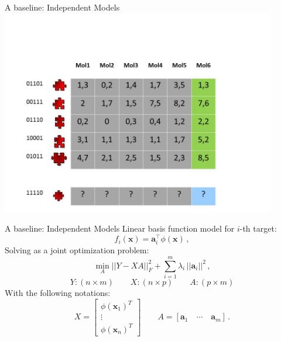 \documentclass[]{beamer}
\renewcommand{\vec}[1]{\boldsymbol{#1}}
\begin{document}
\begin{frame}{A baseline: Independent Models}
\includegraphics[width=0.9\textwidth,trim = 0 0 100 100,clip]{Figures/pictures/Slide15}
\end{frame}

\begin{frame}{A baseline: Independent Models}
\vspace{0.5cm}
Linear basis function model for $i$-th target: 
\begin{equation*}
f_i(\vec{x}) = \vec{a}_i^\intercal \phi(\vec{x}) \,,
\label{eq:binrel}
\end{equation*}
Solving as a joint optimization problem: 
\begin{equation*}
\label{eq:multiridge}
\min_A ||Y - XA ||^2_F +  \sum_{i=1}^m \lambda_i \,||\vec{a}_i||^2 \,,
\end{equation*}
$$Y: (n \times m) \qquad  X: (n \times p) \qquad A: (p \times m)$$
With the following notations: 
\begin{equation*}
\label{eq:notation}
X = \begin{bmatrix} \phi(\vec{x}_1)^T \\ \vdots \\ \phi(\vec{x}_n)^T \end{bmatrix} \qquad A = [\vec{a}_1 \quad \cdots \quad \vec{a}_m] \,.
\end{equation*}


\end{frame}
\end{document}
